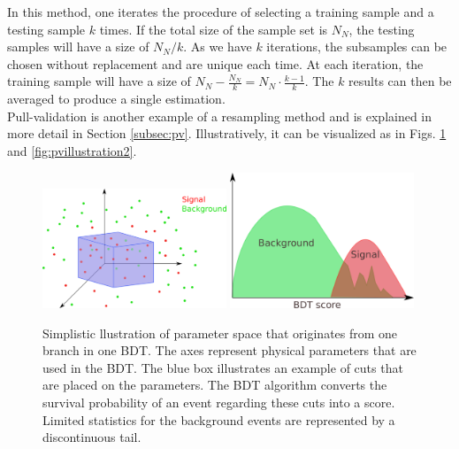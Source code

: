 \begin{appendices}
In this method, one iterates the procedure of selecting a training sample and a testing sample $k$ times. If the total size of the sample set is $N_N$, the testing samples will have a size of $N_N/k$. As we have $k$ iterations, the subsamples can be chosen without replacement and are unique each time. At each iteration, the training sample will have a size of $N_N - \frac{N_N}{k} = N_N \cdot \frac{k-1}{k}$. The $k$ results can then be averaged to produce a single estimation.\\

\noindent Pull-validation is another example of a resampling method and is explained in more detail in Section \ref{subsec:pv}. Illustratively, it can be visualized as in Figs. \ref{fig:pvillustration1} and \ref{fig:pvillustration2}.

\begin{figure}
\centering
\includegraphics[width=0.49\textwidth]{appendix/img/resampling_before.png}
\includegraphics[width=0.49\textwidth]{appendix/img/hist1.png}
\caption{Simplistic llustration of parameter space that originates from one branch in one BDT. The axes represent physical parameters that are used in the BDT. The blue box illustrates an example of cuts that are placed on the parameters. The BDT algorithm converts the survival probability of an event regarding these cuts into a score. Limited statistics for the background events are represented by a discontinuous tail.}
\label{fig:pvillustration1}
\end{figure}


\end{appendices}
